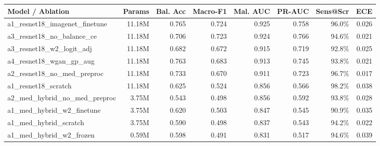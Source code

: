 \begin{tabular}{lrrrrrrr}
\toprule
\textbf{Model / Ablation} & \textbf{Params} & \textbf{Bal. Acc} & \textbf{Macro-F1} & \textbf{Mal. AUC} & \textbf{PR-AUC} & \textbf{Sens@Scr} & \textbf{ECE} \\
\midrule
a1\_resnet18\_imagenet\_finetune & 11.18M & 0.765 & 0.724 & 0.925 & 0.758 & 96.0\% & 0.026 \\
a3\_resnet18\_no\_balance\_ce & 11.18M & 0.706 & 0.723 & 0.924 & 0.766 & 94.6\% & 0.021 \\
a3\_resnet18\_w2\_logit\_adj & 11.18M & 0.682 & 0.672 & 0.915 & 0.719 & 92.8\% & 0.025 \\
a4\_resnet18\_wgan\_gp\_aug & 11.18M & 0.763 & 0.683 & 0.913 & 0.745 & 93.8\% & 0.021 \\
a2\_resnet18\_no\_med\_preproc & 11.18M & 0.733 & 0.670 & 0.911 & 0.723 & 96.7\% & 0.017 \\
a1\_resnet18\_scratch & 11.18M & 0.625 & 0.524 & 0.856 & 0.566 & 98.2\% & 0.038 \\
a2\_med\_hybrid\_no\_med\_preproc & 3.75M & 0.543 & 0.498 & 0.856 & 0.592 & 93.8\% & 0.028 \\
a1\_med\_hybrid\_w2\_finetune & 3.75M & 0.620 & 0.503 & 0.847 & 0.545 & 90.9\% & 0.035 \\
a1\_med\_hybrid\_scratch & 3.75M & 0.590 & 0.498 & 0.837 & 0.543 & 94.2\% & 0.022 \\
a1\_med\_hybrid\_w2\_frozen & 0.59M & 0.598 & 0.491 & 0.831 & 0.517 & 94.6\% & 0.039 \\
\bottomrule
\end{tabular}

